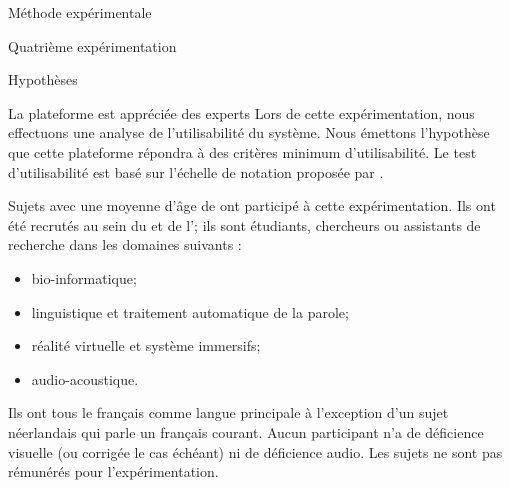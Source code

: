 \documentclass[myfrancais,ngerman,english,french]{mythesis}
\begin{document}
\begin{mychapter}{Méthode expérimentale}
\begin{mysection}{Quatrième expérimentation}
\begin{mysubsection}{Hypothèses}
\begin{myparagraph}{ La plateforme est appréciée des experts}
					Lors de cette expérimentation, nous effectuons une analyse de l'utilisabilité du système.
					Nous émettons l'hypothèse que cette plateforme répondra à des critères minimum d'utilisabilité.
					Le test d'utilisabilité est basé sur l'échelle de notation proposée par .
				\end{myparagraph}
			\end{mysubsection}
			\begin{mysubsection}{Sujets}
				 avec une moyenne d'âge de  ont participé à cette expérimentation.
				Ils ont été recrutés au sein du \myCNRSLIMSI et de l'; ils sont étudiants, chercheurs ou assistants de recherche dans les domaines suivants :
				\begin{itemize}
					\item bio-informatique;
					\item linguistique et traitement automatique de la parole;
					\item réalité virtuelle et système immersifs;
					\item audio-acoustique.
				\end{itemize}
				Ils ont tous le français comme langue principale à l'exception d'un sujet néerlandais qui parle un français courant.
				Aucun participant n'a de déficience visuelle (ou corrigée le cas échéant) ni de déficience audio.
				Les sujets ne sont pas rémunérés pour l'expérimentation.


\end{mysubsection}
\end{mysection}
\end{mychapter}
\end{document}
